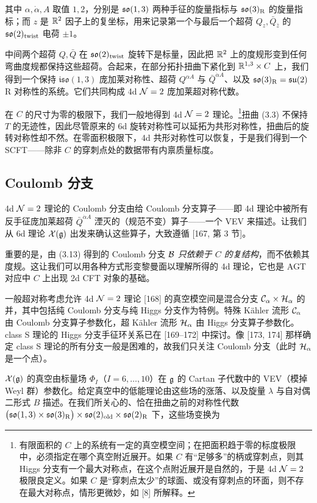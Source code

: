 其中 $\alpha,\dot\alpha,A$ 取值 $1,2$，分别是 $\mathfrak{so}(1,3)$ 两种手征的旋量指标与 $\mathfrak{so}(3)_{\mathrm R}$ 的旋量指标；而 $z$ 是 $\mathbb{R}^2$ 因子上的复坐标，用来记录第一个与最后一个超荷 $Q_z,\bar Q_{\bar z}$ 的 $\mathfrak{so}(2)_{\mathrm{twist}}$ 电荷 $\pm1$。

中间两个超荷 $Q,\bar Q$ 在 $\mathfrak{so}(2)_{\mathrm{twist}}$ 旋转下是标量，因此把 $\mathbb{R}^2$ 上的度规形变到任何弯曲度规都保持这些超荷。合起来，在部分拓扑扭曲下紧化到 $\mathbb{R}^{1,3}\times C$ 上，我们得到一个保持 $\mathfrak{iso}(1,3)$ 庞加莱对称性、超荷 $Q^{\alpha A}$ 与 $\bar Q^{\dot\alpha A}$、以及 $\mathfrak{so}(3)_{\mathrm R}=\mathfrak{su}(2)$ R 对称性的系统。它们共同构成 4d $\mathcal{N}=2$ 庞加莱超对称代数。

在 $C$ 的尺寸为零的极限下，我们一般地得到 4d $\mathcal{N}=2$ 理论。\footnote{有限面积的 $C$ 上的系统有一定的真空模空间；在把面积趋于零的标度极限中，必须指定在哪个真空附近展开。如果 $C$ 有“足够多”的柄或穿刺点，则其 Higgs 分支有一个最大对称点，在这个点附近展开是自然的，于是 4d $\mathcal{N}=2$ 极限良定义。如果 $C$ 是“穿刺点太少”的球面、或没有穿刺点的环面，则不存在最大对称点，情形更微妙，如 [8] 所解释。}扭曲 (3.3) 不保持 $T$ 的无迹性，因此尽管原来的 6d 旋转对称性可以延拓为共形对称性，扭曲后的旋转对称性却不然。在零面积极限下，4d 共形对称性可以恢复，于是我们得到一个 SCFT------除非 $C$ 的穿刺点处的数据带有内禀质量标度。

\subsection{Coulomb 分支}

4d $\mathcal{N}=2$ 理论的 Coulomb 分支由给 Coulomb 分支算子------即 4d 理论中被所有反手征庞加莱超荷 $\bar Q^{\dot\alpha A}$ 湮灭的（规范不变）算子------一个 VEV 来描述。让我们从 6d 理论 $\mathcal{X}(\mathfrak{g})$ 出发来确认这些算子，大致遵循 [167, 第 3 节]。

重要的是，由 (3.13) 得到的 Coulomb 分支 $\mathcal{B}$ \emph{只依赖于 $C$ 的复结构}，而不依赖其度规。这让我们可以用各种方式形变黎曼面以理解所得的 4d 理论，它也是 AGT 对应中 $C$ 上出现 2d CFT 对象的基础。

一般超对称考虑允许 4d $\mathcal{N}=2$ 理论 [168] 的真空模空间是混合分支 $\mathcal{C}_\alpha\times\mathcal{H}_\alpha$ 的并，其中包括纯 Coulomb 分支与纯 Higgs 分支作为特例。特殊 Kähler 流形 $\mathcal{C}_\alpha$ 由 Coulomb 分支算子参数化，超 Kähler 流形 $\mathcal{H}_\alpha$ 由 Higgs 分支算子参数化。class S 理论的 Higgs 分支手征环关系已在 [169--172] 中探讨。像 [173, 174] 那样确定 class S 理论的所有分支一般是困难的，故我们只关注 Coulomb 分支（此时 $\mathcal{H}_\alpha$ 是一个点）。

$\mathcal{X}(\mathfrak{g})$ 的真空由标量场 $\Phi_I$（$I=6,\dots,10$）在 $\mathfrak{g}$ 的 Cartan 子代数中的 VEV（模掉 Weyl 群）参数化。给定真空中的低能理论由这些场的涨落、以及旋量 $\lambda$ 与自对偶二形式 $B$ 描述。在我们所关心的、恰在扭曲之前的对称性代数 $\big(\mathfrak{so}(1,3)\times\mathfrak{so}(3)_{\mathrm R}\big)\times\mathfrak{so}(2)_{\mathrm{old}}\times\mathfrak{so}(2)_{\mathrm R}$ 下，这些场变换为

